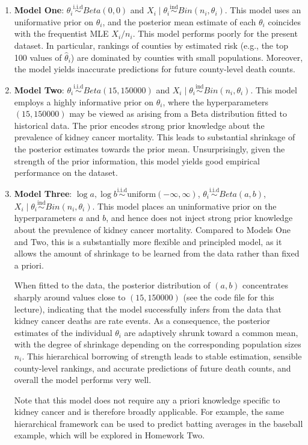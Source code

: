 \documentclass{scrartcl}
\begin{document}
\begin{enumerate}
\item \textbf{Model One}: $\theta_i \overset{\text{i.i.d}}{\sim} Beta(0, 0)$
and $X_i \mid \theta_i \overset{\text{ind}}{\sim} Bin(n_i,
\theta_i)$. This model uses an uniformative prior on $\theta_i$, and
the posterior mean estimate of each $\theta_i$ coincides with the
frequentist MLE $X_i/n_i$. This model performs poorly for the present
dataset. In particular, rankings of counties by estimated risk (e.g.,
the top 100 values of $\hat{\theta}_i$) are 
dominated by counties with small populations. Moreover, the model
yields inaccurate predictions for future county-level death counts.
\item \textbf{Model Two}: $\theta_i \overset{\text{i.i.d}}{\sim} Beta(15, 150000)$
and $X_i \mid \theta_i \overset{\text{ind}}{\sim} Bin(n_i,
\theta_i)$. This model employs a highly informative prior on
$\theta_i$, where the hyperparameters $(15, 150000)$ may be viewed as
arising from a Beta distribution fitted to historical data. The prior
encodes strong prior knowledge about the prevalence of kidney cancer
mortality. This leads to substantial shrinkage of the posterior
estimates towards the prior mean. Unsurprisingly, given the strength
of the prior information, this model yields good empirical performance
on the dataset. 
\item \textbf{Model Three}: $\log a, \log b
  \overset{\text{i.i.d}}{\sim} \text{uniform}(-\infty, \infty)$,
  $\theta_i   \overset{\text{i.i.d}}{\sim} Beta(a, b)$, $X_i \mid
  \theta_i \overset{\text{ind}}{\sim} Bin(n_i, \theta_i)$. This model
  places an uninformative prior on the hyperparameters $a$ and $b$,
  and hence does not inject strong prior knowledge about the
  prevalence of kidney cancer mortality. Compared to Models One and
  Two, this is a substantially more flexible and principled model, as
  it allows the amount of shrinkage to be learned from the data rather
  than fixed a priori.

  When fitted to the data, the posterior distribution of $(a, b)$
  concentrates sharply around values close to $(15, 150000)$ (see the
  code file for this lecture), indicating that the model successfully
  infers from the data that kidney cancer deaths are rate events. As a
  consequence, the posterior estimates of the individual $\theta_i$
  are adaptively shrunk toward a common mean, with the degree of
  shrinkage depending on the corresponding population sizes
  $n_i$. This hierarchical borrowing of strength leads to stable
  estimation, sensible county-level rankings, and accurate predictions
  of future death counts, and overall the model performs very well.

  Note that this model does not require any a priori knowledge
  specific to kidney cancer and is therefore broadly applicable. For
  example, the same hierarchical framework can be used to predict
  batting averages in the baseball example, which will be explored in
  Homework Two. 
\end{enumerate}
\end{document}
